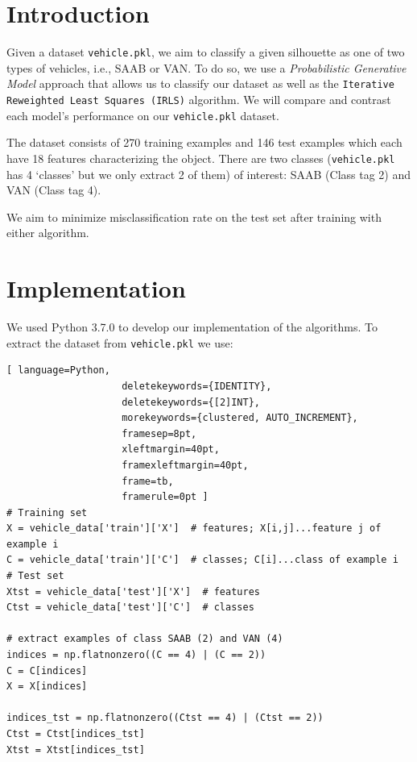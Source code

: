 \documentclass[a4paper,11pt,oneside]{article}
\begin{document}
  \newpage
  \tableofcontents

  \clearpage

\section{Introduction}
  Given a dataset \texttt{vehicle.pkl}, we aim to classify a given silhouette as one of two types of vehicles, i.e., SAAB or VAN. To do so, we use a \textit{Probabilistic Generative Model} approach that allows us to classify our dataset as well as the \texttt{Iterative Reweighted Least Squares (IRLS)} algorithm. We will compare and contrast each model's performance on our \texttt{vehicle.pkl} dataset.

The dataset consists of 270 training examples and 146 test examples which each have 18 features characterizing the object. There are two classes (\texttt{vehicle.pkl} has 4 `classes' but we only extract 2 of them) of interest: SAAB (Class tag 2) and VAN (Class tag 4).

We aim to minimize misclassification rate on the test set after training with either algorithm.

\newpage

\section{Implementation}

We used Python 3.7.0 to develop our implementation of the algorithms. To extract the dataset from \texttt{vehicle.pkl} we use:
\begin{lstlisting}[ language=Python,
                    deletekeywords={IDENTITY},
                    deletekeywords={[2]INT},
                    morekeywords={clustered, AUTO_INCREMENT},
                    framesep=8pt,
                    xleftmargin=40pt,
                    framexleftmargin=40pt,
                    frame=tb,
                    framerule=0pt ]
# Training set
X = vehicle_data['train']['X']  # features; X[i,j]...feature j of example i
C = vehicle_data['train']['C']  # classes; C[i]...class of example i
# Test set
Xtst = vehicle_data['test']['X']  # features
Ctst = vehicle_data['test']['C']  # classes

# extract examples of class SAAB (2) and VAN (4)
indices = np.flatnonzero((C == 4) | (C == 2))
C = C[indices]
X = X[indices]

indices_tst = np.flatnonzero((Ctst == 4) | (Ctst == 2))
Ctst = Ctst[indices_tst]
Xtst = Xtst[indices_tst]
\end{lstlisting}
\end{document}
